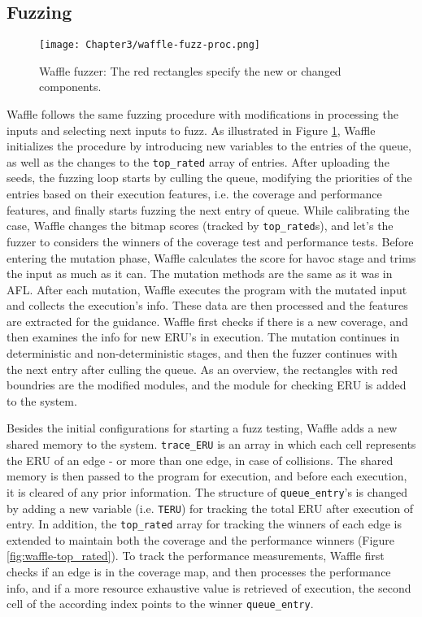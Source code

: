 \subsection{Fuzzing}


\begin{figure}[!b]
  \texttt{[image: Chapter3/waffle-fuzz-proc.png]}
  \centering
  \caption{Waffle fuzzer: The red rectangles specify the new or changed components.}
  \label{fig:waffle-fuzz-proc}
\end{figure}

Waffle follows the same fuzzing procedure with modifications in processing the inputs and selecting next inputs to fuzz. As illustrated in Figure \ref{fig:waffle-fuzz-proc}, Waffle initializes the procedure by introducing new variables to the entries of the queue, as well as the changes to the \texttt{top\_rated} array of entries. After uploading the seeds, the fuzzing loop starts by culling the queue, modifying the priorities of the entries based on their execution features, i.e. the coverage and performance features, and finally starts fuzzing the next entry of queue. While calibrating the case, Waffle changes the bitmap scores (tracked by \texttt{top\_rated}s), and let's the fuzzer to considers the winners of the coverage test and performance tests. Before entering the mutation phase, Waffle calculates the score for havoc stage and trims the input as much as it can. The mutation methods are the same as it was in AFL. After each mutation, Waffle executes the program with the mutated input and collects the execution's info. These data are then processed and the features are extracted for the guidance. Waffle first checks if there is a new coverage, and then examines the info for new ERU's in execution. The mutation continues in deterministic and non-deterministic stages, and then the fuzzer continues with the next entry after culling the queue. As an overview, the rectangles with red boundries are the modified modules, and the module for checking ERU is added to the system.


Besides the initial configurations for starting a fuzz testing, Waffle adds a new shared memory to the system. \texttt{trace\_ERU} is an array in which each cell represents the ERU of an edge - or more than one edge, in case of collisions. The shared memory is then passed to the program for execution, and before each execution, it is cleared of any prior information. The structure of \texttt{queue\_entry}'s is changed by adding a new variable (i.e. \texttt{TERU}) for tracking the total ERU after execution of entry. In addition, the \texttt{top\_rated} array for tracking the winners of each edge is extended to maintain both the coverage and the performance winners (Figure \ref{fig:waffle-top_rated}). To track the performance measurements, Waffle first checks if an edge is in the coverage map, and then processes the performance info, and if a more resource exhaustive value is retrieved of execution, the second cell of the according index points to the winner \texttt{queue\_entry}. 

